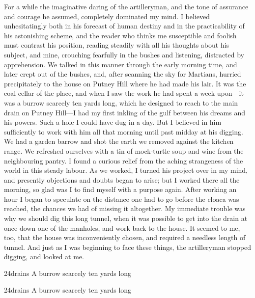 For a while the imaginative daring of the artilleryman, and the tone of assurance and courage he assumed, completely dominated my mind. I believed unhesitatingly both in his forecast of human destiny and in the practicability of his astonishing scheme, and the reader who thinks me susceptible and foolish must contrast his position, reading steadily with all his thoughts about his subject, and mine, crouching fearfully in the bushes and listening, distracted by apprehension. We talked in this manner through the early morning time, and later crept out of the bushes, and, after scanning the sky for Martians, hurried precipitately to the house on Putney Hill where he had made his lair. It was the coal cellar of the place, and when I saw the work he had spent a week upon—it was a burrow scarcely ten yards long, which he designed to reach to the main drain on Putney Hill—I had my first inkling of the gulf between his dreams and his powers. Such a hole I could have dug in a day. But I believed in him sufficiently to work with him all that morning until past midday at his digging. We had a garden barrow and shot the earth we removed against the kitchen range. We refreshed ourselves with a tin of mock-turtle soup and wine from the neighbouring pantry. I found a curious relief from the aching strangeness of the world in this steady labour. As we worked, I turned his project over in my mind, and presently objections and doubts began to arise; but I worked there all the morning, so glad was I to find myself with a purpose again. After working an hour I began to speculate on the distance one had to go before the cloaca was reached, the chances we had of missing it altogether. My immediate trouble was why we should dig this long tunnel, when it was possible to get into the drain at once down one of the manholes, and work back to the house. It seemed to me, too, that the house was inconveniently chosen, and required a needless length of tunnel. And just as I was beginning to face these things, the artilleryman stopped digging, and looked at me.


\begin{letter}
	\begin{bwbigpic}
		[1.2] 
		{24drains} 
		{A burrow scarcely ten yards long} 
	\end{bwbigpic}
\end{letter}
\begin{a4}
	\begin{bwbigpic}
		[1.1] 
		{24drains} 
		{A burrow scarcely ten yards long} 
	\end{bwbigpic}

\end{a4}


